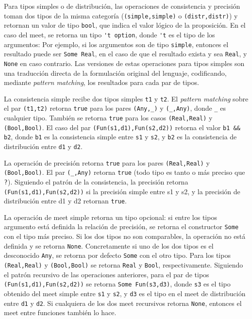 Para tipos simples o de distribución, las operaciones de consistencia
y precisión toman dos tipos de la misma categoría
(\verb|(simple,simple)| o \verb|(distr,distr)|) y retornan un valor de
tipo \verb|bool|, que indica el valor lógico de la proposición. En el
caso del meet, se retorna un tipo \verb|'t option|, donde \verb|'t| es
el tipo de los argumentos: Por ejemplo, si los argumentos son de tipo
\verb|simple|, entonces el resultado puede ser \verb|Some Real|, en el
caso de que el resultado exista y sea \verb|Real|, y \verb|None| en
caso contrario.  Las versiones de estas operaciones para tipos
simples son una traducción directa de la formulación original del
lenguaje, codificando, mediante \emph{pattern matching}, los resultados
para cada par de tipos.

La consistencia simple recibe dos tipos simples \verb|t1| y
\verb|t2|. El \emph{pattern matching} sobre el par \verb|(t1,t2)| retorna
\verb|true| para los pares \verb|(Any,_)| y \verb|(_,Any)|, donde
\verb|_| es cualquier tipo. También se retorna \verb|true| para los
casos \verb|(Real,Real)| y \verb|(Bool,Bool)|. El caso del par
\verb|(Fun(s1,d1),Fun(s2,d2))| retorna el valor \verb|b1 && b2|,
donde \verb|b1| es la consistencia simple entre \verb|s1| y \verb|s2|,
y \verb|b2| es la consistencia de distribución entre \verb|d1| y
\verb|d2|.

La operación de precisión retorna \verb|true| para los pares
\verb|(Real,Real)| y \verb|(Bool,Bool)|. El par \verb|(_,Any)| retorna
\verb|true| (todo tipo es tanto o más preciso que $\mathord{\text{\sffamily ?}}$). Siguiendo el
patrón de la consistencia, la precisión retorna
\verb|(Fun(s1,d1),Fun(s2,d2))| si la precisión simple entre s1 y s2, y
la precisión de distribución entre d1 y d2 retornan \verb|true|.


La operación de meet simple retorna un tipo opcional: si entre los tipos argumento está definida la relación de precisión, se retorna el constructor \verb|Some| con el tipo más preciso. Si los dos tipos no son comparables, la operación no está definida y se retorna \verb|None|. Concretamente si uno de los dos tipos es el desconocido \verb|Any|, se retorna por defecto \verb|Some| con el otro tipo. Para los tipos \verb|(Real,Real)| y \verb|(Bool,Bool)| se retorna \verb|Real| y \verb|Bool|, respectivamente.
Siguiendo el patrón recursivo de las operaciones anteriores,
para el par de tipos \verb|(Fun(s1,d1),Fun(s2,d2))| se retorna \verb|Some Fun(s3,d3)|, donde \verb|s3| es el tipo obtenido del meet simple entre \verb|s1| y \verb|s2|, y \verb|d3| es el tipo en el meet de distribución entre \verb|d1| y \verb|d2|. Si cualquiera de los dos meet recursivos retorna \verb|None|, entonces el meet entre funciones también lo hace.

